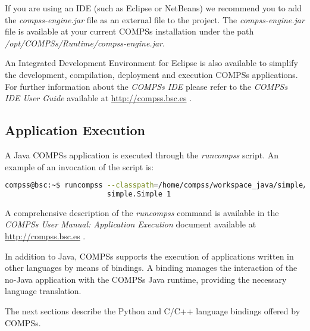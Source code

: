 If you are using an IDE (such as Eclipse or NetBeans) we recommend you to add the \textit{compss-engine.jar} file as an external file 
to the project. The \textit{compss-engine.jar} file is available at your current COMPSs installation under the path \textit{/opt/COMPSs/Runtime/compss-engine.jar}.


An Integrated Development Environment for Eclipse is also available to simplify the development, compilation,
deployment and execution COMPSs applications. For further information about the \textit{COMPSs IDE} please refer to the \textit{COMPSs IDE
User Guide} available at \url{http://compss.bsc.es} .


\subsection{Application Execution}
A Java COMPSs application is executed through the \textit{runcompss} script. An example of an invocation of the script is:

\begin{lstlisting}[language=bash]
compss@bsc:~$ runcompss --classpath=/home/compss/workspace_java/simple/jar/simple.jar 
                        simple.Simple 1
\end{lstlisting}

A comprehensive description of the \textit{runcompss} command is available in the \textit{COMPSs User Manual: Application
Execution} document available at \url{http://compss.bsc.es} . 
\newline
~ \newline

In addition to Java, COMPSs supports the execution of applications written in other languages by 
means of bindings. A binding manages the interaction of the no-Java application with the COMPSs 
Java runtime, providing the necessary language translation.

The next sections describe the Python and C/C++ language bindings offered by COMPSs.
